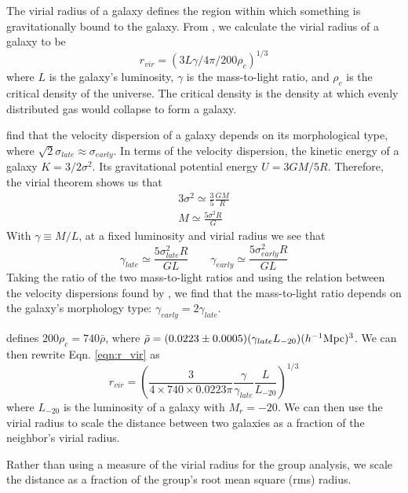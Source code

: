 The virial radius of a galaxy defines the region within which something is 
gravitationally bound to the galaxy.  From \cite{Hwang10}, we calculate the 
virial radius of a galaxy to be
\begin{equation}\label{eqn:r_vir}
    r_{vir} = (3L\gamma/4\pi/200\rho_c)^{1/3}
\end{equation}
where $L$ is the galaxy's luminosity, $\gamma$ is the mass-to-light ratio, and 
$\rho_c$ is the critical density of the universe.  The critical density is the 
density at which evenly distributed gas would collapse to form a galaxy.  

\cite{Choi07} find that the velocity dispersion of a galaxy depends on its 
morphological type, where $\sqrt{2}\sigma_{late} \approx \sigma_{early}$.  In 
terms of the velocity dispersion, the kinetic energy of a galaxy 
$K = 3/2 \sigma^2$.  Its gravitational potential energy $U = 3GM/5R$.  
Therefore, the virial theorem shows us that
\begin{align}
    3\sigma^2 \simeq \frac{3}{5} \frac{GM}{R}\nonumber \\
    M \simeq \frac{5\sigma^2 R}{G}
\end{align}
With $\gamma \equiv M/L$, at a fixed luminosity and virial radius we see that
\begin{equation}
    \gamma_{late} \simeq \frac{5\sigma_{late}^2 R}{GL} \qquad \gamma_{early} \simeq \frac{5\sigma_{early}^2 R}{GL}
\end{equation}
Taking the ratio of the two mass-to-light ratios and using the relation between 
the velocity dispersions found by \cite{Choi07}, we find that the mass-to-light 
ratio depends on the galaxy's morphology type: $\gamma_{early} = 2\gamma_{late}$.

\cite{Hwang10} defines $200\rho_c = 740\bar{\rho}$, where 
$\bar{\rho} = (0.0223\pm 0.0005)(\gamma_{late}L_{-20})(\text{$h^{-1}$Mpc})^3$.  We can 
then rewrite Eqn. \ref{eqn:r_vir} as
\begin{equation}
    r_{vir} = \left( \frac{3}{4\times 740\times 0.0223\pi} \frac{\gamma}{\gamma_{late}} \frac{L}{L_{-20}} \right)^{1/3}
\end{equation}
where $L_{-20}$ is the luminosity of a galaxy with $M_r = -20$.  We can then use 
the virial radius to scale the distance between two galaxies as a fraction of 
the neighbor's virial radius.

Rather than using a measure of the virial radius for the group analysis, we 
scale the distance as a fraction of the group's root mean square (rms) radius.


